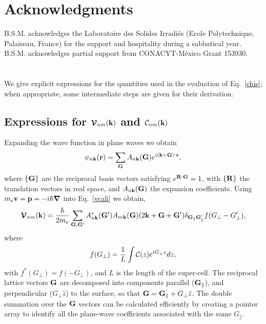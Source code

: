 \documentclass[floatfix,prb,aps,superscriptaddress,showpacs,11pt,preprint,letterpaper]{revtex4}
\begin{document}
\section{Acknowledgments}


B.S.M. acknowledges the Laboratoire des Solides Irradi\'es (Ecole
Polytechnique, Palaiseau, France) for the support and hospitality
during a sabbatical year. B.S.M. acknowledges partial support from
CONACYT-M\'exico Grant 153930. 

\appendix 
\section{}\label{appe}
We give explicit expressions for the quantities used in the evaluation 
of Eq.~\eqref{chis}; when appropriate, some 
intermediate steps are given for their derivation. 
\subsection{ Expressions for 
\texorpdfstring{${\boldsymbol{\mathcal{\cal V}}}_{nm}(\mathbf{k})$}{que} 
and 
\texorpdfstring{${\cal C}_{nm}(\mathbf{k})$}{que}
}\label{calpcalc}

Expanding the wave function in plane waves we obtain
\begin{align}\label{eni.1}
\psi_{n\mathbf{k}}(\mathbf{r})=\sum_{\mathbf{G}} A_{n\mathbf{k}}(\mathbf{G})e^{i(\mathbf{k}+\mathbf{G})\cdot\mathbf{r}}
,
\end{align}
where $\{\mathbf{G}\}$ are the reciprocal basis vectors satisfying
$e^{\mathbf{R}\cdot\mathbf{G}}=1$, with $\{\mathbf{R}\}$ the translation vectors in real
space, and $A_{n\mathbf{k}}(\mathbf{G})$ the expansion coefficients. Using
$m_e\mathbf{v}=\mathbf{p}=-i\hbar\boldsymbol{\nabla}$ into 
Eq.~\eqref{vcali}
we obtain,\cite{mendozaPRB06}
\begin{align}\label{eni.2}
\boldsymbol{\mathcal{\cal V}}_{nm}(\mathbf{k})=
\frac{\hbar}{2m_e}
\sum_{\mathbf{G},\mathbf{G}'} A^*_{n\mathbf{k}}(\mathbf{G}')  A_{m\mathbf{k}}(\mathbf{G})
(2\mathbf{k}+\mathbf{G}+\mathbf{G}')
\delta_{\mathbf{G}_\parallel \mathbf{G}'_\parallel}  
f(G_\perp-G'_\perp)
,
\end{align}   
where
\begin{align}\label{vnl.9}
f(G_\perp)=\frac{1}{L}\int{\mathbf{\cal C}}(z) e^{iG_\perp z}dz  
 ,
\end{align}
with $f^*(G_\perp)=f(-G_\perp)$,
and $L$
is the length of the super-cell. 
The reciprocal lattice vectors $\mathbf{G}$ are 
decomposed into components
parallel ($\mathbf{G}_\parallel$), and perpendicular ($G_\perp \hat z$)
to the surface, so
that $\mathbf{G} = \mathbf{G}_\parallel + G_\perp\hat z$.
The double summation over the $\mathbf{G}$ vectors can be 
calculated efficiently by  
creating a pointer array to identify all the plane-wave coefficients  
associated with the same $G_\parallel$.  
\end{document}
